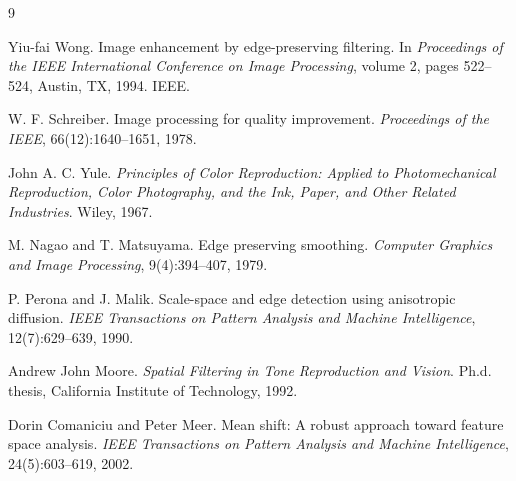 \documentclass[a4paper]{report}
\begin{document}
\begin{thebibliography}{9}
\vspace{-2.8pt}
\addtolength{\itemsep}{-2.4pt}

Yiu-fai Wong. Image enhancement by edge-preserving filtering. In \textit{Proceedings
of the IEEE International Conference on Image Processing}, volume 2, pages
522--524, Austin, TX, 1994. IEEE.

W. F. Schreiber. Image processing for quality improvement. \textit{Proceedings of the
IEEE}, 66(12):1640--1651, 1978.

John A. C. Yule. \textit{Principles of Color Reproduction: Applied to Photomechanical
Reproduction, Color Photography, and the Ink, Paper, and Other Related
Industries}. Wiley, 1967.

M. Nagao and T. Matsuyama. Edge preserving smoothing. \textit{Computer Graphics
and Image Processing}, 9(4):394--407, 1979.

P. Perona and J. Malik. Scale-space and edge detection using anisotropic
diffusion. \textit{IEEE Transactions on Pattern Analysis and Machine Intelligence},
12(7):629--639, 1990.

Andrew John Moore. \textit{Spatial Filtering in Tone Reproduction and Vision}. Ph.d.
thesis, California Institute of Technology, 1992.

Dorin Comaniciu and Peter Meer. Mean shift: A robust approach toward feature
space analysis. \textit{IEEE Transactions on Pattern Analysis and Machine Intelligence},
24(5):603--619, 2002.

\end{thebibliography}
\end{document}
